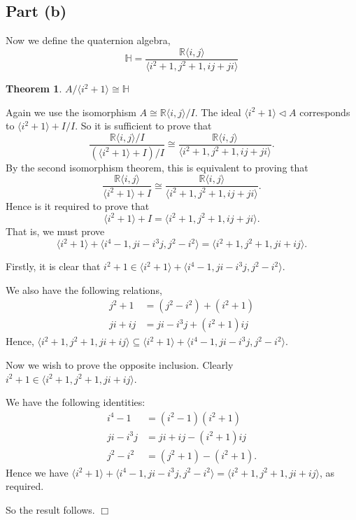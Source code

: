 \documentclass[10pt]{article}
\newtheorem{theorem}{Theorem}
\newenvironment{proof}[1][Proof]{\begin{trivlist}
\item[\hskip \labelsep {\bfseries #1}]}{\end{trivlist}}
\newcommand{\isom}{\cong}
\begin{document}
\subsection*{Part (b)}
Now we define the quaternion algebra,
\begin{equation*}
    \mathbb{H} = \frac{\mathbb{R}\langle i,j\rangle}{\langle i^2+1,j^2+1,ij+ji\rangle}
\end{equation*}
\begin{theorem}
    $A/\langle i^2+1\rangle \isom \mathbb{H}$
\end{theorem}
\begin{proof}
    Again we use the isomorphism $A \isom \mathbb{R}\langle i,j\rangle/I$. 
    The ideal $\langle i^2+1\rangle \lhd A$ corresponds
    to $\langle i^2+1\rangle+I/I$. So it is sufficient to prove that
    \begin{equation*}
        \frac{\mathbb{R}\langle i,j\rangle/I}{(\langle i^2+1\rangle+I)/I}\isom \frac{\mathbb{R}\langle i,j\rangle}{\langle i^2+1,j^2+1,ij+ji\rangle}.
    \end{equation*}
    By the second isomorphism theorem, this is equivalent to proving that
    \begin{equation*}
        \frac{\mathbb{R}\langle i,j\rangle}{\langle i^2+1\rangle+I}\isom \frac{\mathbb{R}\langle i,j\rangle}{\langle i^2+1,j^2+1,ij+ji\rangle}.
    \end{equation*}
    Hence is it required to prove that
    \begin{equation*}
        \langle i^2+1\rangle+I = \langle i^2+1,j^2+1,ij+ji\rangle.
    \end{equation*}
    That is, we must prove
    \begin{equation*}
        \langle i^2+1\rangle +\langle i^4-1,ji-i^3j,j^2-i^2\rangle = \langle i^2+1,j^2+1,ji+ij\rangle.
    \end{equation*}
    
    Firstly, it is clear that $i^2+1\in \langle i^2+1\rangle +\langle i^4-1,ji-i^3j,j^2-i^2\rangle$. 
    
    We also have the following relations,
    \begin{align*}
        j^2+1 &= (j^2-i^2)+(i^2+1)\\
        ji+ij &= ji-i^3j+(i^2+1)ij
    \end{align*}
    Hence, $\langle i^2+1,j^2+1,ji+ij\rangle \subseteq \langle i^2+1\rangle +\langle i^4-1,ji-i^3j,j^2-i^2\rangle$. 
    
    Now we wish to prove the opposite inclusion. Clearly $i^2+1\in \langle i^2+1,j^2+1,ji+ij\rangle$.
    
    We have the following identities:
    \begin{align*}
        i^4-1 &= (i^2-1)(i^2+1)\\
        ji-i^3j &= ji+ij-(i^2+1)ij\\        
        j^2-i^2 &= (j^2+1)-(i^2+1).
    \end{align*}
    Hence we have $\langle i^2+1\rangle +\langle i^4-1,ji-i^3j,j^2-i^2\rangle = \langle i^2+1,j^2+1,ji+ij\rangle$, as required.
    
    So the result follows. $\Box$ 
\end{proof}
    
\end{document}

